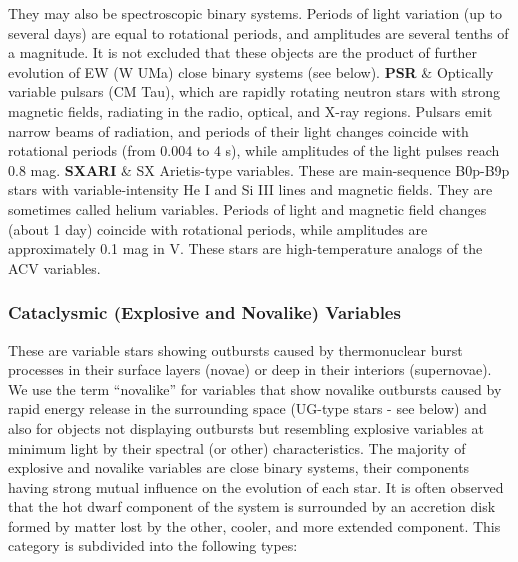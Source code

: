 \begin{longtabu}
They may also be spectroscopic binary systems. Periods of light
variation (up to several days) are equal to rotational periods, and
amplitudes are several tenths of a magnitude. It is not excluded that
these objects are the product of further evolution of EW (W UMa) close
binary systems (see below).\tabularnewline
\midrule
\textbf{PSR} & Optically variable pulsars (CM Tau), which are rapidly
rotating neutron stars with strong magnetic fields, radiating in the
radio, optical, and X-ray regions. Pulsars emit narrow beams of
radiation, and periods of their light changes coincide with rotational
periods (from 0.004 to 4 s), while amplitudes of the light pulses reach
0.8 mag.\tabularnewline
\midrule
\textbf{SXARI} & SX Arietis-type variables. These are main-sequence
B0p-B9p stars with variable-intensity He I and Si III lines and magnetic
fields. They are sometimes called helium variables. Periods of light and
magnetic field changes (about 1 day) coincide with rotational periods,
while amplitudes are approximately 0.1 mag in V. These stars are
high-temperature analogs of the ACV variables.\tabularnewline
\bottomrule
\end{longtabu}

\subsubsection{Cataclysmic (Explosive and Novalike)
Variables}\label{cataclysmic-explosive-and-novalike-variables}

These are variable stars showing outbursts caused by thermonuclear burst
processes in their surface layers (novae) or deep in their interiors
(supernovae). We use the term ``novalike'' for variables that show
novalike outbursts caused by rapid energy release in the surrounding
space (UG-type stars - see below) and also for objects not displaying
outbursts but resembling explosive variables at minimum light by their
spectral (or other) characteristics. The majority of explosive and
novalike variables are close binary systems, their components having
strong mutual influence on the evolution of each star. It is often
observed that the hot dwarf component of the system is surrounded by an
accretion disk formed by matter lost by the other, cooler, and more
extended component. This category is subdivided into the following
types:

